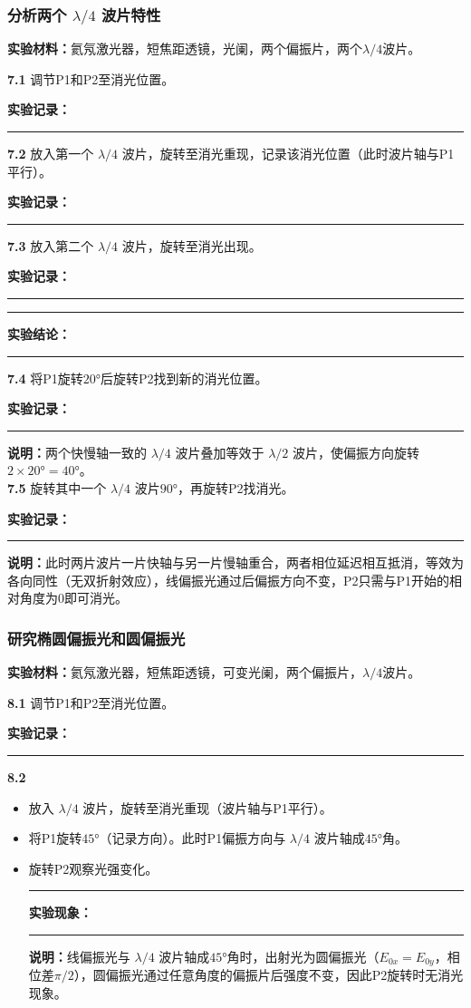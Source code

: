 \documentclass[dvipsnames, svgnames,a4paper,11pt]{article}
\newcommand{\recordblank}[1]{%
  \par\noindent\rule{0.95\linewidth}{0pt}\rule{0pt}{#1}\par}
\begin{document}
\subsubsection{分析两个 $\lambda/4$ 波片特性}
\textbf{实验材料：}氦氖激光器，短焦距透镜，光阑，两个偏振片，两个$\lambda/4$波片。

\textbf{7.1} 调节P1和P2至消光位置。

\textbf{实验记录：}\par
\recordblank{2.8cm}

\textbf{7.2} 放入第一个 $\lambda/4$ 波片，旋转至消光重现，记录该消光位置（此时波片轴与P1平行）。

\textbf{实验记录：}\par
\recordblank{2.8cm}

\textbf{7.3} 放入第二个 $\lambda/4$ 波片，旋转至消光出现。

\textbf{实验记录：}\par
\recordblank{2.8cm}
\recordblank{5cm}
\textbf{实验结论：}\par
\recordblank{2.8cm}

\textbf{7.4} 将P1旋转$20°$后旋转P2找到新的消光位置。

\textbf{实验记录：}\par
\recordblank{2.8cm}

\textbf{说明：}两个快慢轴一致的 $\lambda/4$ 波片叠加等效于 $\lambda/2$ 波片，使偏振方向旋转$2\times20°=40°$。\\

\textbf{7.5} 旋转其中一个 $\lambda/4$ 波片$90°$，再旋转P2找消光。

\textbf{实验记录：}\par
\recordblank{2.8cm}

\textbf{说明：}此时两片波片一片快轴与另一片慢轴重合，两者相位延迟相互抵消，等效为各向同性（无双折射效应），线偏振光通过后偏振方向不变，P2只需与P1开始的相对角度为0即可消光。

\subsubsection{研究椭圆偏振光和圆偏振光}
\textbf{实验材料：}氦氖激光器，短焦距透镜，可变光阑，两个偏振片，$\lambda/4$波片。

\textbf{8.1} 调节P1和P2至消光位置。

\textbf{实验记录：}\par
\recordblank{2.8cm}

\textbf{8.2}
\begin{itemize}
    \item 放入 $\lambda/4$ 波片，旋转至消光重现（波片轴与P1平行）。
    \item 将P1旋转$45°$（记录方向）。此时P1偏振方向与 $\lambda/4$ 波片轴成$45°$角。
    \item 旋转P2观察光强变化。
    \recordblank{5cm}
    \par\noindent\textbf{实验现象：}\par
\recordblank{4cm}
    
    \textbf{说明：}线偏振光与 $\lambda/4$ 波片轴成$45°$角时，出射光为圆偏振光（$E_{0x}=E_{0y}$，相位差$\pi/2$），圆偏振光通过任意角度的偏振片后强度不变，因此P2旋转时无消光现象。
\end{itemize}
\end{document}
